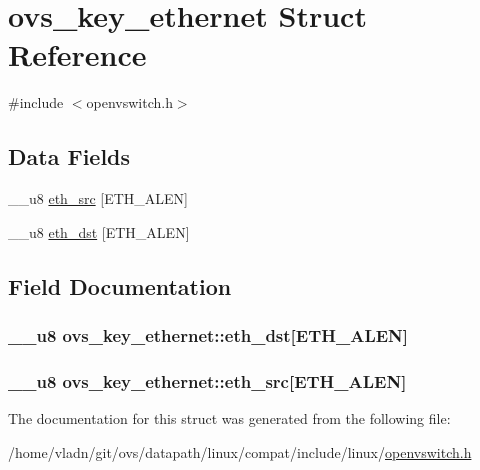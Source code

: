 \hypertarget{structovs__key__ethernet}{}\section{ovs\+\_\+key\+\_\+ethernet Struct Reference}
\label{structovs__key__ethernet}


{\ttfamily \#include $<$openvswitch.\+h$>$}

\subsection*{Data Fields}
\begin{DoxyCompactItemize}
\item 
\+\_\+\+\_\+u8 \hyperlink{structovs__key__ethernet_adc19d64e3aa45c9383f332981780b79b}{eth\+\_\+src} \mbox{[}E\+T\+H\+\_\+\+A\+L\+E\+N\mbox{]}
\item 
\+\_\+\+\_\+u8 \hyperlink{structovs__key__ethernet_a12fa99b386c86f65221f6d2394a9d7c9}{eth\+\_\+dst} \mbox{[}E\+T\+H\+\_\+\+A\+L\+E\+N\mbox{]}
\end{DoxyCompactItemize}


\subsection{Field Documentation}
\hypertarget{structovs__key__ethernet_a12fa99b386c86f65221f6d2394a9d7c9}{}
\subsubsection[{eth\+\_\+dst}]{\setlength{\rightskip}{0pt plus 5cm}\+\_\+\+\_\+u8 ovs\+\_\+key\+\_\+ethernet\+::eth\+\_\+dst\mbox{[}E\+T\+H\+\_\+\+A\+L\+E\+N\mbox{]}}\label{structovs__key__ethernet_a12fa99b386c86f65221f6d2394a9d7c9}
\hypertarget{structovs__key__ethernet_adc19d64e3aa45c9383f332981780b79b}{}
\subsubsection[{eth\+\_\+src}]{\setlength{\rightskip}{0pt plus 5cm}\+\_\+\+\_\+u8 ovs\+\_\+key\+\_\+ethernet\+::eth\+\_\+src\mbox{[}E\+T\+H\+\_\+\+A\+L\+E\+N\mbox{]}}\label{structovs__key__ethernet_adc19d64e3aa45c9383f332981780b79b}


The documentation for this struct was generated from the following file\+:\begin{DoxyCompactItemize}
\item 
/home/vladn/git/ovs/datapath/linux/compat/include/linux/\hyperlink{openvswitch_8h}{openvswitch.\+h}\end{DoxyCompactItemize}

